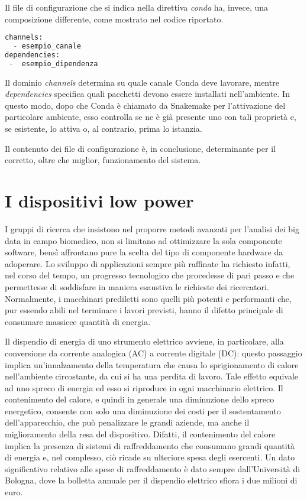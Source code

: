 Il file di configurazione che si indica nella direttiva \textit{conda} ha, invece, una composizione differente, come mostrato nel codice riportato.
\begin{lstlisting}[language=Python]
channels:
  - esempio_canale
dependencies:
 -  esempio_dipendenza
\end{lstlisting}
Il dominio \textit{channels} determina su quale canale Conda deve lavorare, mentre \textit{dependencies} specifica quali pacchetti devono essere installati nell'ambiente.
In questo modo, dopo che Conda è chiamato da Snakemake per l'attivazione del particolare ambiente, esso controlla se ne è già presente uno con tali proprietà e, se esistente, lo attiva o, al contrario, prima lo istanzia.

Il contenuto dei file di configurazione è, in conclusione, determinante per il corretto, oltre che miglior, funzionamento del sistema.

\section{I dispositivi low power}
I gruppi di ricerca che insistono nel proporre metodi avanzati per l'analisi dei big data in campo biomedico, non si limitano ad ottimizzare la sola componente software, bensì affrontano pure la scelta del tipo di componente hardware da adoperare.
Lo sviluppo di applicazioni sempre più raffinate ha richiesto infatti, nel corso del tempo, un progresso tecnologico che procedesse di pari passo e che permettesse di soddisfare in maniera esaustiva le richieste dei ricercatori.
Normalmente, i macchinari prediletti sono quelli più potenti e performanti che, pur essendo abili nel terminare i lavori previsti, hanno il difetto principale di consumare massicce quantità di energia.

Il dispendio di energia di uno strumento elettrico avviene, in particolare, alla conversione da corrente analogica (AC) a corrente digitale (DC): questo passaggio implica un'innalzamento della temperatura che causa lo sprigionamento di calore nell'ambiente circostante, da cui si ha una perdita di lavoro.
Tale effetto equivale ad uno spreco di energia ed esso si riproduce in ogni macchinario elettrico.
Il contenimento del calore, e quindi in generale una diminuzione dello spreco energetico, consente non solo una diminuzione dei costi per il sostentamento dell'apparecchio, che può penalizzare le grandi aziende, ma anche il miglioramento della resa del dispositivo.
Difatti, il contenimento del calore implica la presenza di sistemi di raffreddamento che consumano grandi quantità di energia e, nel complesso, ciò ricade su ulteriore spesa degli esercenti.
Un dato significativo relativo alle spese di raffreddamento è dato sempre dall'Università di Bologna, dove la bolletta annuale per il dispendio elettrico sfiora i due milioni di euro.

